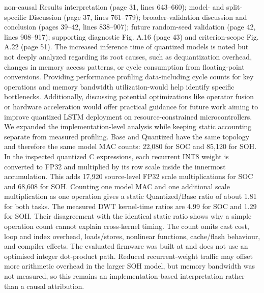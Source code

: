 {} non-causal Results interpretation (page 31, lines 643--660); model- and split-specific Discussion (page 37, lines 761--779); broader-validation discussion and conclusion (pages 39--42, lines 838--907); future random-seed validation (page 42, lines 908--917); supporting diagnostic Fig. A.16 (page 43) and criterion-scope Fig. A.22 (page 51).\markdownRendererInterblockSeparator
{}
\markdownRendererSectionEnd \markdownRendererSectionBegin
{}\markdownRendererInterblockSeparator
{}\markdownRendererBlockQuoteBegin
The increased inference time of quantized models is noted but not deeply analyzed regarding its root causes, such as dequantization overhead, changes in memory access patterns, or cycle consumption from floating-point conversions. Providing performance profiling data-including cycle counts for key operations and memory bandwidth utilization-would help identify specific bottlenecks. Additionally, discussing potential optimizations like operator fusion or hardware acceleration would offer practical guidance for future work aiming to improve quantized LSTM deployment on resource-constrained microcontrollers.\markdownRendererBlockQuoteEnd \markdownRendererInterblockSeparator
{} We expanded the implementation-level analysis while keeping static accounting separate from measured profiling. Base and Quantized have the same topology and therefore the same model MAC counts: 22,080 for SOC and 85,120 for SOH. In the inspected quantized C expressions, each recurrent INT8 weight is converted to FP32 and multiplied by its row scale inside the innermost accumulation. This adds 17,920 source-level FP32 scale multiplications for SOC and 68,608 for SOH. Counting one model MAC and one additional scale multiplication as one operation gives a static Quantized/Base ratio of about 1.81 for both tasks.\markdownRendererParagraphSeparator
{}The measured DWT kernel-time ratios are 4.99 for SOC and 1.29 for SOH. Their disagreement with the identical static ratio shows why a simple operation count cannot explain cross-kernel timing. The count omits cast cost, loop and index overhead, loads/stores, nonlinear functions, cache/flash behaviour, and compiler effects. The evaluated firmware was built at  and does not use an optimised integer dot-product path. Reduced recurrent-weight traffic may offset more arithmetic overhead in the larger SOH model, but memory bandwidth was not measured, so this remains an implementation-based interpretation rather than a causal attribution.\markdownRendererParagraphSeparator
